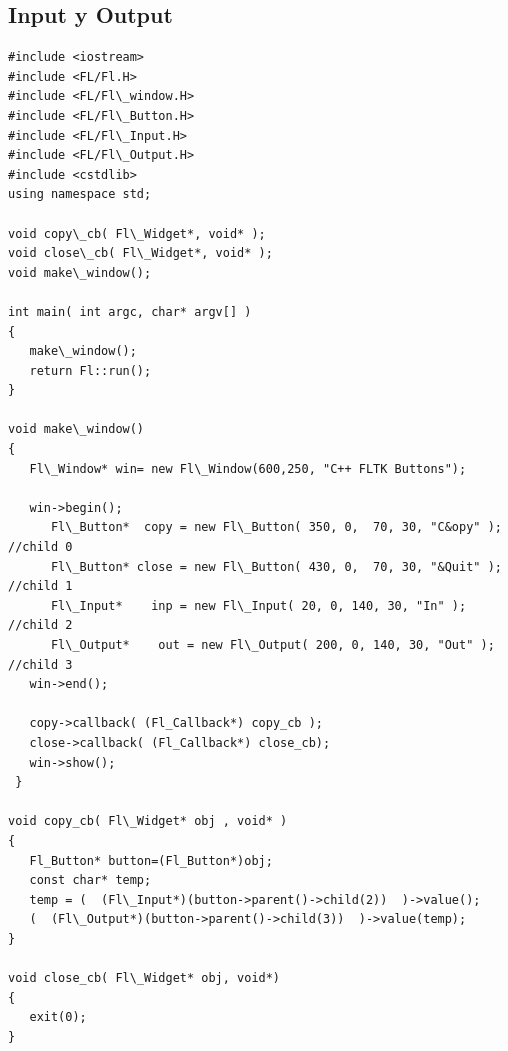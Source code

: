\documentclass[10pt, oneside]{article}   	%
\begin{document}
\subsection{Input y Output}
\begin{lstlisting}
#include <iostream>
#include <FL/Fl.H>
#include <FL/Fl\_window.H>
#include <FL/Fl\_Button.H>
#include <FL/Fl\_Input.H>
#include <FL/Fl\_Output.H>
#include <cstdlib>
using namespace std;

void copy\_cb( Fl\_Widget*, void* );  
void close\_cb( Fl\_Widget*, void* ); 
void make\_window();

int main( int argc, char* argv[] )
{
   make\_window();
   return Fl::run();
}

void make\_window()
{
   Fl\_Window* win= new Fl\_Window(600,250, "C++ FLTK Buttons");

   win->begin();        
      Fl\_Button*  copy = new Fl\_Button( 350, 0,  70, 30, "C&opy" ); //child 0
      Fl\_Button* close = new Fl\_Button( 430, 0,  70, 30, "&Quit" );   //child 1
      Fl\_Input*    inp = new Fl\_Input( 20, 0, 140, 30, "In" );       //child 2
      Fl\_Output*    out = new Fl\_Output( 200, 0, 140, 30, "Out" );  //child 3
   win->end();

   copy->callback( (Fl_Callback*) copy_cb );
   close->callback( (Fl_Callback*) close_cb);
   win->show();
 }

void copy_cb( Fl\_Widget* obj , void* )
{
   Fl_Button* button=(Fl_Button*)obj;
   const char* temp;   
   temp = (  (Fl\_Input*)(button->parent()->child(2))  )->value();
   (  (Fl\_Output*)(button->parent()->child(3))  )->value(temp);
}

void close_cb( Fl\_Widget* obj, void*)
{
   exit(0);
}
\end{lstlisting}
\end{document}
